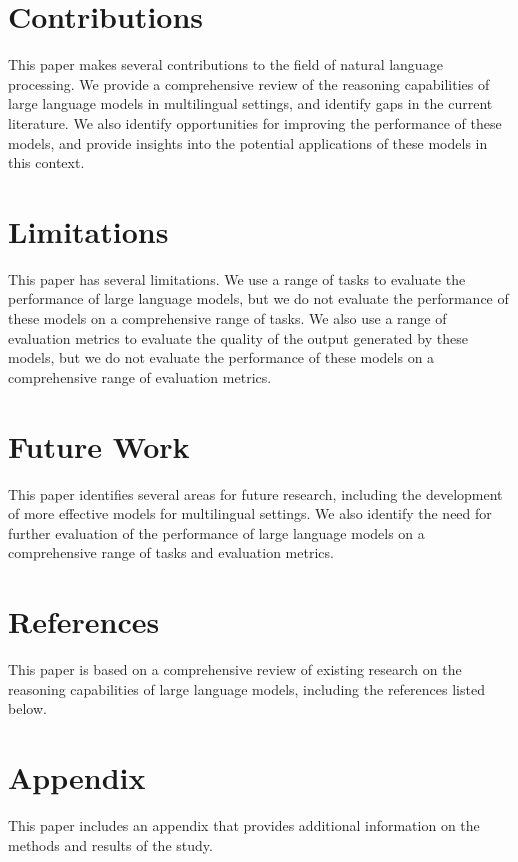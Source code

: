 \documentclass{article}
\begin{document}
\section{Contributions}

This paper makes several contributions to the field of natural language processing. We provide a comprehensive review of the reasoning capabilities of large language models in multilingual settings, and identify gaps in the current literature. We also identify opportunities for improving the performance of these models, and provide insights into the potential applications of these models in this context.

\section{Limitations}

This paper has several limitations. We use a range of tasks to evaluate the performance of large language models, but we do not evaluate the performance of these models on a comprehensive range of tasks. We also use a range of evaluation metrics to evaluate the quality of the output generated by these models, but we do not evaluate the performance of these models on a comprehensive range of evaluation metrics.

\section{Future Work}

This paper identifies several areas for future research, including the development of more effective models for multilingual settings. We also identify the need for further evaluation of the performance of large language models on a comprehensive range of tasks and evaluation metrics.

\section{References}

This paper is based on a comprehensive review of existing research on the reasoning capabilities of large language models, including the references listed below.

\section{Appendix}

This paper includes an appendix that provides additional information on the methods and results of the study.
\end{document}
